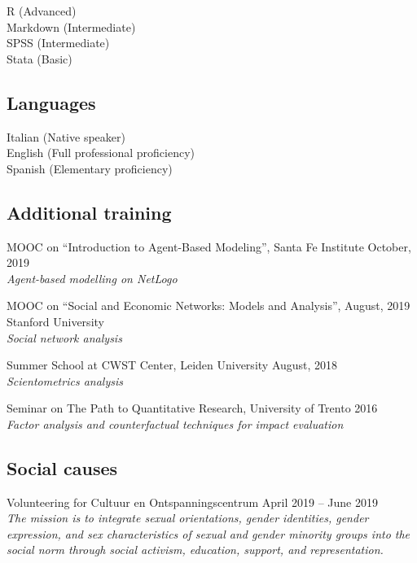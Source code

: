 \documentclass[12pt,]{article}
\begin{document}
R (Advanced)\\
Markdown (Intermediate)\\
SPSS (Intermediate)\\
Stata (Basic) \newline

\hypertarget{languages}{%
\subsection{Languages}\label{languages}}

Italian (Native speaker)\\
English (Full professional proficiency)\\
Spanish (Elementary proficiency) \newline

\hypertarget{additional-training}{%
\subsection{Additional training}\label{additional-training}}

MOOC on ``Introduction to Agent-Based Modeling'', Santa Fe Institute
\hfill \begingroup\small October, 2019\endgroup\\
\emph{Agent-based modelling on NetLogo}

MOOC on ``Social and Economic Networks: Models and Analysis'',
\hfill \begingroup\small August, 2019\endgroup\\
Stanford University\\
\emph{Social network analysis}

Summer School at CWST Center, Leiden University
\hfill \begingroup\small August, 2018\endgroup\\
\emph{Scientometrics analysis}

Seminar on The Path to Quantitative Research, University of Trento
\hfill \begingroup\small 2016\endgroup\\
\emph{Factor analysis and counterfactual techniques for impact
evaluation} \newline

\hypertarget{social-causes}{%
\subsection{Social causes}\label{social-causes}}

Volunteering for Cultuur en Ontspanningscentrum
\hfill \begingroup\small April 2019 – June 2019\endgroup\\
\emph{The mission is to integrate sexual orientations, gender
identities, gender expression, and sex characteristics of sexual and
gender minority groups into the social norm through social activism,
education, support, and representation.}
\end{document}
